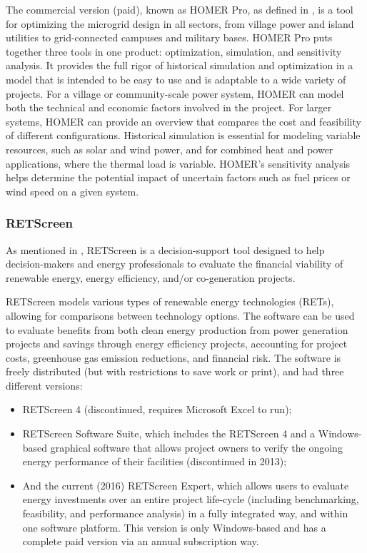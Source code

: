 The commercial version (paid), known as HOMER Pro, as defined in \cite{Swarnkar}, is a tool for optimizing the microgrid design in all sectors, from village power and island utilities to grid-connected campuses and military bases. HOMER Pro puts together three tools in one product: optimization, simulation, and sensitivity analysis. It provides the full rigor of historical simulation and optimization in a model that is intended to be easy to use and is adaptable to a wide variety of projects. For a village or community-scale power system, HOMER can model both the technical and economic factors involved in the project. For larger systems, HOMER can provide an overview that compares the cost and feasibility of different configurations. Historical simulation is essential for modeling variable resources, such as solar and wind power, and for combined heat and power applications, where the thermal load is variable. HOMER's sensitivity analysis helps determine the potential impact of uncertain factors such as fuel prices or wind speed on a given system. 

\subsubsection{RETScreen}

As mentioned in \cite{Pradhan}, RETScreen is a decision-support tool designed to help decision-makers and energy professionals to evaluate the financial viability of renewable energy, energy efficiency, and/or co-generation projects.

RETScreen models various types of renewable energy technologies (RETs), allowing for comparisons between technology options. The software can be used to evaluate benefits from both clean energy production from power generation projects and savings through energy efficiency projects, accounting for project costs, greenhouse gas emission reductions, and financial risk. The software is freely distributed (but with restrictions to save work or print), and had three different versions:

\begin{itemize}
\item RETScreen 4 (discontinued, requires Microsoft Excel to run); 
\item RETScreen Software Suite, which includes the RETScreen 4 and a Windows-based graphical software that allows project owners to verify the ongoing energy performance of their facilities (discontinued in 2013);
\item And the current (2016) RETScreen Expert, which allows users to evaluate energy investments over an entire project life-cycle (including benchmarking, feasibility, and performance analysis) in a fully integrated way, and within one software platform. This version is only Windows-based and has a complete paid version via an annual subscription way.
\end{itemize}

